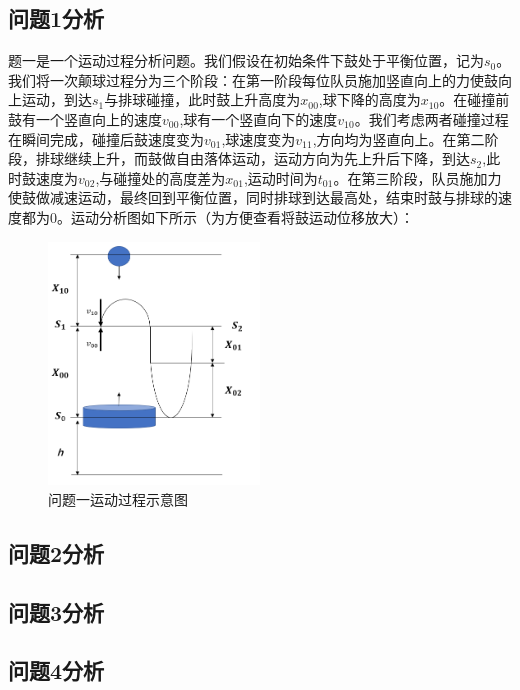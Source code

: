 \documentclass{cumcm}
\begin{document}
\subsection{问题1分析}
题一是一个运动过程分析问题。我们假设在初始条件下鼓处于平衡位置，记为$s_0$。我们将一次颠球过程分为三个阶段：在第一阶段每位队员施加竖直向上的力使鼓向上运动，到达$s_1$与排球碰撞，此时鼓上升高度为$x_{00}$,球下降的高度为$x_{10}$。在碰撞前鼓有一个竖直向上的速度$v_{00}$,球有一个竖直向下的速度$v_{10}$。我们考虑两者碰撞过程在瞬间完成，碰撞后鼓速度变为$v_{01}$,球速度变为$v_{11}$,方向均为竖直向上。在第二阶段，排球继续上升，而鼓做自由落体运动，运动方向为先上升后下降，到达$s_2$,此时鼓速度为$v_{02}$,与碰撞处的高度差为$x_{01}$,运动时间为$t_{01}$。在第三阶段，队员施加力使鼓做减速运动，最终回到平衡位置，同时排球到达最高处，结束时鼓与排球的速度都为$0$。运动分析图如下所示（为方便查看将鼓运动位移放大）：
\begin{figure}[H]
\centering
\includegraphics[width=0.5\textwidth]{img/question1.png}
\caption{问题一运动过程示意图}\label{fig-buoy}
\end{figure}

\subsection{问题2分析}
\subsection{问题3分析}
\subsection{问题4分析}
\end{document}
